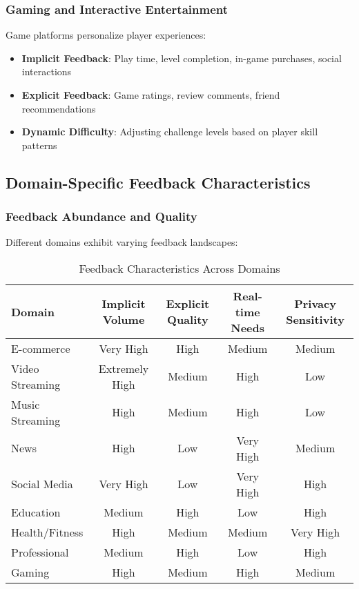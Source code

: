 \subsubsection{Gaming and Interactive Entertainment}

Game platforms personalize player experiences:

\begin{itemize}
    \item \textbf{Implicit Feedback}: Play time, level completion, in-game purchases, social interactions
    \item \textbf{Explicit Feedback}: Game ratings, review comments, friend recommendations
    \item \textbf{Dynamic Difficulty}: Adjusting challenge levels based on player skill patterns
\end{itemize}

\subsection{Domain-Specific Feedback Characteristics}

\subsubsection{Feedback Abundance and Quality}

Different domains exhibit varying feedback landscapes:

\begin{table}[h]
\centering
\caption{Feedback Characteristics Across Domains}
\label{tab:domain_feedback}
\begin{tabular}{@{}lcccc@{}}
\toprule
Domain & Implicit Volume & Explicit Quality & Real-time Needs & Privacy Sensitivity \\
\midrule
E-commerce & Very High & High & Medium & Medium \\
Video Streaming & Extremely High & Medium & High & Low \\
Music Streaming & High & Medium & High & Low \\
News & High & Low & Very High & Medium \\
Social Media & Very High & Low & Very High & High \\
Education & Medium & High & Low & High \\
Health/Fitness & High & Medium & Medium & Very High \\
Professional & Medium & High & Low & High \\
Gaming & High & Medium & High & Medium \\
\bottomrule
\end{tabular}
\end{table}

